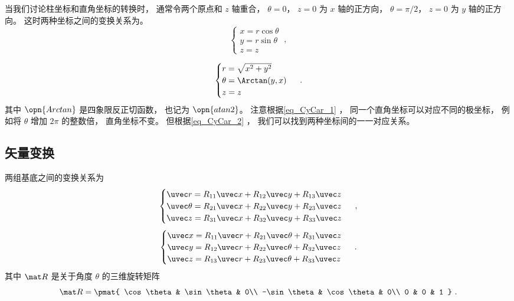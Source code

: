 

当我们讨论柱坐标和直角坐标的转换时， 通常令两个原点和 $z$ 轴重合， $\theta = 0$， $z = 0$ 为 $x$ 轴的正方向， $\theta = \pi/2$， $z = 0$ 为 $y$ 轴的正方向。 这时两种坐标之间的变换关系为。
\begin{equation}\label{eq_CyCar_1}
\begin{cases}
x = r\cos \theta \\
y = r\sin \theta  \\
z = z 
\end{cases}~,
\end{equation}

\begin{equation}\label{eq_CyCar_2}
\begin{cases}
r = \sqrt{x^2+y^2} \\
\theta = \Arctan(y,x)  \\
z = z 
\end{cases}~.
\end{equation}
其中 $\opn{Arctan}$ 是四象限反正切函数， 也记为 $\opn{atan2}$。 注意根据\autoref{eq_CyCar_1} ， 同一个直角坐标可以对应不同的极坐标， 例如将 $\theta$ 增加 $2\pi$ 的整数倍， 直角坐标不变。 但根据\autoref{eq_CyCar_2} ， 我们可以找到两种坐标间的一一对应关系。


\subsection{矢量变换}
两组基底之间的变换关系为
\begin{equation}\label{eq_CyCar_3}
\begin{cases}
\uvec r = R_{11}\uvec x + R_{12}\uvec y + R_{13}\uvec z\\
\uvec \theta = R_{21}\uvec x + R_{22}\uvec y + R_{23}\uvec z\\
\uvec z = R_{31}\uvec x + R_{32}\uvec y + R_{33}\uvec z
\end{cases}~,
\end{equation}
\begin{equation}\label{eq_CyCar_4}
\begin{cases}
\uvec x = R_{11} \uvec r + R_{21} \uvec \theta  + R_{31} \uvec z \\
\uvec y = R_{12} \uvec r + R_{22} \uvec \theta  + R_{32} \uvec z \\
\uvec z = R_{13} \uvec r + R_{23} \uvec \theta  + R_{33} \uvec z
\end{cases}~.
\end{equation}
其中 $\mat R$ 是关于角度 $\theta$ 的三维旋转矩阵
\begin{equation}
\mat R = \pmat{
    \cos\theta & \sin\theta & 0\\
    -\sin\theta & \cos\theta & 0\\
    0 & 0 & 1
}~.
\end{equation}

